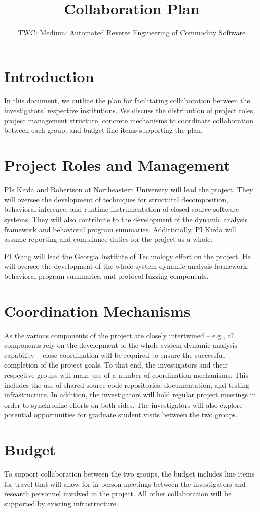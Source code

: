 \documentclass[letterpaper,11pt]{scrartcl}
\newcommand{\thetitle}{TWC: Medium: Automated Reverse Engineering of Commodity Software\xspace}
\begin{document}
\title{Collaboration Plan}
\subtitle{\thetitle}
\author{}
\date{}
\maketitle

\section{Introduction}
\label{sec:introduction}

In this document, we outline the plan for facilitating collaboration between
the investigators' respective institutions.  We discuss the distribution of
project roles, project management structure, concrete mechanisms to coordinate
collaboration between each group, and budget line items supporting the plan.

\section{Project Roles and Management}
\label{sec:roles}

PIs Kirda and Robertson at Northeastern University will lead the project. They
will oversee the development of techniques for structural decomposition,
behavioral inference, and runtime instrumentation of closed-source software
systems.  They will also contribute to the development of the dynamic analysis
framework and behavioral program summaries.  Additionally, PI Kirda will
assume reporting and compliance duties for the project as a whole.

PI Wang will lead the Georgia Institute of Technology effort on the project.
He will oversee the development of the whole-system dynamic analysis
framework, behavioral program summaries, and protocol fuzzing components.

\section{Coordination Mechanisms}
\label{sec:coordination}

As the various components of the project are closely intertwined -- e.g., all
components rely on the development of the whole-system dynamic analysis
capability -- close coordination will be required to ensure the successful
completion of the project goals.  To that end, the investigators and their
respective groups will make use of a number of coordination mechanisms.  This
includes the use of shared source code repositories, documentation, and
testing infrastructure.  In addition, the investigators will hold regular
project meetings  in order to synchronize efforts on both sides.  The
investigators will also explore potential opportunities for graduate student
visits between the two groups.

\section{Budget}
\label{sec:budget}

To support collaboration between the two groups, the budget includes line
items for travel that will allow for in-person meetings between the
investigators and research personnel involved in the project.  All other
collaboration will be supported by existing infrastructure.
\end{document}
